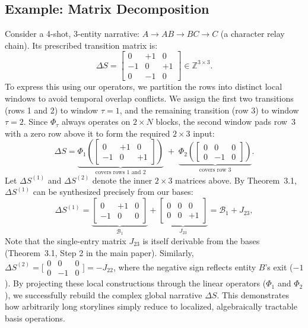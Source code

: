\documentclass[sigconf,review,anonymous]{acmart}
\newcommand{\calB}{\mathcal{B}}
\begin{document}
\subsection{Example: Matrix Decomposition}
Consider a 4-shot, 3-entity narrative: $A \!\to\! AB \!\to\! BC \!\to\! C$ (a character relay chain). Its prescribed transition matrix is:
\begin{equation}
\Delta S = \begin{bmatrix} 0 & +1 & 0 \\ -1 & 0 & +1 \\ 0 & -1 & 0 \end{bmatrix} \in \mathbb{Z}^{3 \times 3}.
\end{equation}
To express this using our operators, we partition the rows into distinct local windows to avoid temporal overlap conflicts. We assign the first two transitions (rows 1 and 2) to window $\tau=1$, and the remaining transition (row 3) to window $\tau=2$. Since $\Phi_\tau$ always operates on $2 \times N$ blocks, the second window pads row~3 with a zero row above it to form the required $2 \times 3$ input:
\begin{equation}
\Delta S = \underbrace{\Phi_1\!\left(\begin{bmatrix} 0 & +1 & 0 \\ -1 & 0 & +1 \end{bmatrix}\right)}_{\text{covers rows 1 and 2}} \;+\; \underbrace{\Phi_2\!\left(\begin{bmatrix} 0 & 0 & 0 \\ 0 & -1 & 0 \end{bmatrix}\right)}_{\text{covers row 3}}.
\label{eq:worked_decomp}
\end{equation}
Let $\Delta S^{(1)}$ and $\Delta S^{(2)}$ denote the inner $2 \times 3$ matrices above. By Theorem~3.1, $\Delta S^{(1)}$ can be synthesized precisely from our bases:
\begin{equation}
\Delta S^{(1)} = \underbrace{\begin{bmatrix} 0 & +1 & 0 \\ -1 & 0 & 0 \end{bmatrix}}_{\calB_1} + \underbrace{\begin{bmatrix} 0 & 0 & 0 \\ 0 & 0 & +1 \end{bmatrix}}_{J_{23}} = \calB_1 + J_{23},
\end{equation}
Note that the single-entry matrix $J_{23}$ is itself derivable from the bases (Theorem~3.1, Step 2 in the main paper). Similarly, $\Delta S^{(2)} = \bigl[\begin{smallmatrix} 0 & 0 & 0 \\ 0 & -1 & 0 \end{smallmatrix}\bigr] = -J_{22}$, where the negative sign reflects entity $B$'s exit ($-1$). By projecting these local constructions through the linear operators ($\Phi_1$ and $\Phi_2$), we successfully rebuild the complex global narrative $\Delta S$. This demonstrates how arbitrarily long storylines simply reduce to localized, algebraically tractable basis operations.
\end{document}

